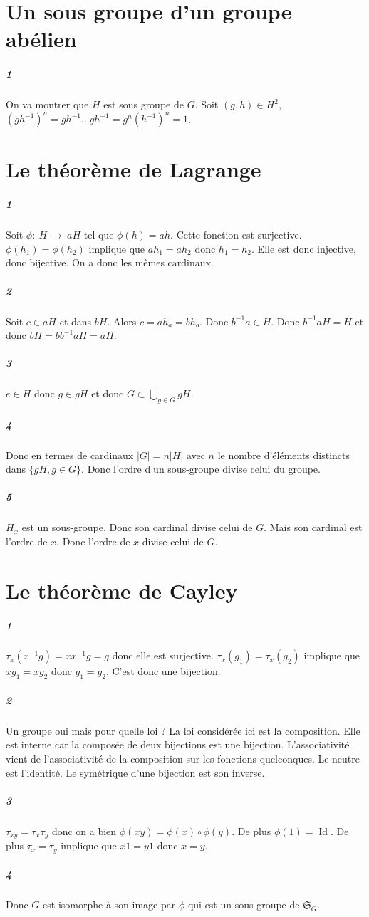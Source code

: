 \documentclass[10pt,a4paper]{article}
\begin{document}
\section{Un sous groupe d'un groupe abélien}
\subparagraph{1}On va montrer que $H$ est sous groupe de $G$. Soit $(g,h) \in H^2$, $(gh^{-1})^n = gh^{-1} \dots gh^{-1} = g^n (h^{-1})^n = 1$. 
\section{Le théorème de Lagrange}
\subparagraph{1}Soit $\phi: \ H \ \rightarrow \ aH$ tel que $\phi(h) = ah$. Cette fonction est surjective. $\phi(h_1) = \phi(h_2)$ implique que $ah_1 = ah_2$ donc $h_1 = h_2$. Elle est donc injective, donc bijective. On a donc les mêmes cardinaux.
\subparagraph{2}Soit $c \in aH$ et dans $bH$. Alors $c =ah_a = bh_b$. Donc $b^{-1}a \in H$. Donc $b^{-1}aH = H$ et donc $bH = b b^{-1} a H = aH$.
\subparagraph{3}$e \in H$ donc $g \in gH$ et donc $G \subset \underset{g \in G}{\bigcup} gH$.
\subparagraph{4} Donc en termes de cardinaux $\vert G \vert = n \vert H \vert$ avec $n$ le nombre d'éléments distincts dans $\lbrace gH, g \in G \rbrace$. Donc l'ordre d'un sous-groupe divise celui du groupe.
\subparagraph{5}$H_x$ est un sous-groupe. Donc son cardinal divise celui de $G$. Mais son cardinal est l'ordre de $x$. Donc l'ordre de $x$ divise celui de $G$.

\section{Le théorème de Cayley}
\subparagraph{1}$\tau_x(x^{-1}g) = xx^{-1}g =g$ donc elle est surjective. $\tau_x(g_1) = \tau_x(g_2)$ implique que $xg_1 = xg_2$ donc $g_1 = g_2$. C'est donc une bijection.
\subparagraph{2}Un groupe oui mais pour quelle loi ? La loi considérée ici est la composition. Elle est interne car la composée de deux bijections est une bijection. L'associativité vient de l'associativité de la composition sur les fonctions quelconques. Le neutre est l'identité. Le symétrique d'une bijection est son inverse.
\subparagraph{3}$\tau_{xy} = \tau_x \tau_y$ donc on a bien $\phi(xy) = \phi(x) \circ \phi(y)$. De plus $\phi(1) = \operatorname{Id}$. De plus $\tau_x = \tau_y$ implique que $x1 =y1$ donc $x=y$. 
\subparagraph{4}Donc $G$ est isomorphe à son image par $\phi$ qui est un sous-groupe de $\mathfrak{S}_G$.
\end{document}
